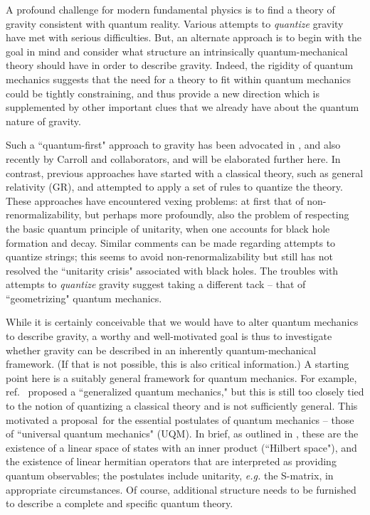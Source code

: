 \Date{}



A profound challenge for modern fundamental physics is to find a theory of gravity consistent with quantum reality.  Various attempts to {\it quantize} gravity have met with serious difficulties. But, an alternate approach is to begin with the goal in mind and consider what structure an intrinsically quantum-mechanical theory should have in order to describe gravity.  Indeed, the rigidity of quantum mechanics suggests that the need for a theory to fit within quantum mechanics could be tightly constraining, and thus provide a new direction which is supplemented by other important clues that we already have about the quantum nature of gravity.

Such a ``quantum-first" approach to gravity has been advocated in , and also recently by Carroll and collaborators, and will be elaborated further here.  In contrast, previous approaches have started with a classical theory, such as general relativity (GR), and attempted to apply a set of rules to quantize the theory.  These approaches have encountered vexing problems: at first that of non-renormalizability, but perhaps more profoundly, also the problem of respecting the basic quantum principle of unitarity, when one accounts for black hole formation and decay.  Similar comments can be made regarding attempts to quantize strings; this seems to avoid non-renormalizability but still has not resolved the ``unitarity crisis" associated with black holes.
The troubles with attempts to {\it quantize} gravity suggest taking a different tack -- that of ``geometrizing" quantum mechanics.

While it is certainly conceivable that we would have to alter quantum mechanics to describe gravity, a worthy and well-motivated goal is  thus to investigate whether gravity can be described in an inherently quantum-mechanical framework.  (If that is not possible, this is also critical information.)  A starting point here is a suitably general framework for quantum mechanics. For example, ref.~ proposed a ``generalized quantum mechanics,"  but this is still too closely tied to the notion of quantizing a classical theory and is not sufficiently general.  This motivated a proposal\UQM\ for the essential postulates of quantum mechanics -- those of ``universal quantum mechanics"  (UQM).  In brief, as outlined in \UQM, these are the existence of a linear space of states with an inner product (``Hilbert space"), and the existence of linear hermitian operators that are interpreted as providing quantum observables; the postulates include unitarity, {\it e.g.} the S-matrix, in appropriate circumstances.  Of course, additional structure needs to be furnished to describe a complete and specific quantum theory.

